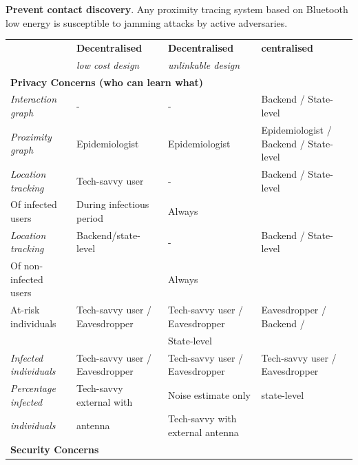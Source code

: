 \documentclass[10.8pt,a4paper]{article}
\begin{document}
\textbf{Prevent contact discovery}. Any proximity tracing system based on Bluetooth low energy is susceptible to jamming attacks by active adversaries.
\begin{table}[H]
\centering

\begin{tabular}{p{4cm}p{5cm}p{5cm}p{5cm}}\hline
 & \textbf{Decentralised} &  \textbf{Decentralised} & \textbf{centralised} \\
 & \emph{low cost design} &  \emph{unlinkable design} & \emph{} \\
  \hline
 \multicolumn{3}{l}{\textbf{Privacy Concerns (who can learn what)}}\\
 
 \textit{Interaction graph} & - & - &Backend / State-level \\
 
 \textit{Proximity graph} & Epidemiologist &  Epidemiologist & Epidemiologist / Backend / State-level\\
 
\textit{Location tracking} & Tech-savvy user & - & Backend / State-level\\
\small Of infected users & \small During infectious period & Always \small \\

\textit{Location tracking} & Backend/state-level & - & Backend / State-level\\
\small Of non-infected users & & \small Always\\

At-risk individuals & Tech-savvy user / Eavesdropper & Tech-savvy user / Eavesdropper &  Eavesdropper / Backend /\\
 & & State-level\\
\textit{Infected individuals} & Tech-savvy user / Eavesdropper & Tech-savvy user / Eavesdropper &  Tech-savvy user / Eavesdropper\\

\textit{Percentage infected} & Tech-savvy external with & Noise estimate only & state-level\\
\textit{individuals} & antenna &  Tech-savvy with external antenna \\ \hline

\multicolumn{4}{l}{\textbf{Security Concerns}}\\


\end{tabular}
\end{table}
\end{document}
